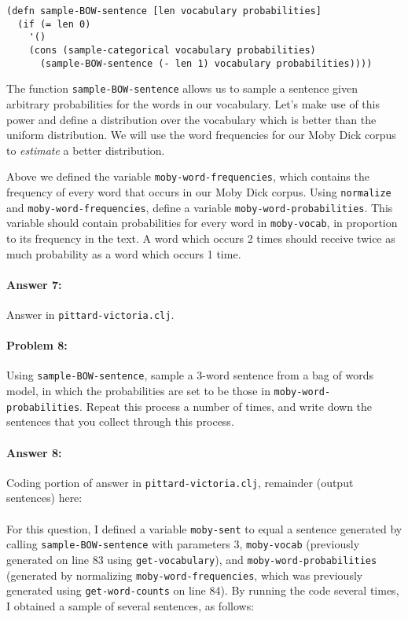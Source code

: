 \documentclass[10pt]{article}
\begin{document}
\begin{lstlisting}
(defn sample-BOW-sentence [len vocabulary probabilities]
  (if (= len 0)
    '()
    (cons (sample-categorical vocabulary probabilities)
	  (sample-BOW-sentence (- len 1) vocabulary probabilities))))
\end{lstlisting}

The function \texttt{sample-BOW-sentence} allows us to sample a
sentence given arbitrary probabilities for the words in our
vocabulary. Let's make use of this power and define a distribution
over the vocabulary which is better than the uniform distribution. We
will use the word frequencies for our Moby Dick corpus to
\emph{estimate} a better distribution.
  
Above we defined the variable \texttt{moby-word-frequencies}, which
contains the frequency of every word that occurs in our Moby Dick
corpus. Using \texttt{normalize} and \texttt{moby-word-frequencies},
define a variable \texttt{moby-word-probabilities}. This variable
should contain probabilities for every word in \texttt{moby-vocab}, in
proportion to its frequency in the text. A word which occurs 2 times
should receive twice as much probability as a word which occurs 1
time.

\paragraph{Answer 7:} Answer in
\texttt{pittard-victoria.clj}.

\hrulefill
\paragraph{Problem 8:}

Using \texttt{sample-BOW-sentence}, sample a 3-word sentence from a
bag of words model, in which the probabilities are set to be those in
\texttt{moby-word-probabilities}. Repeat this process a number of
times, and write down the sentences that you collect through this
process.

\paragraph{Answer 8:} Coding portion of answer in
\texttt{pittard-victoria.clj}, remainder (output sentences) here:

\paragraph{} For this question, I defined a variable \texttt{moby-sent} to equal a sentence generated by calling \texttt{sample-BOW-sentence} with parameters $3$, \texttt{moby-vocab} (previously generated on line 83 using \texttt{get-vocabulary}), and \texttt{moby-word-probabilities} (generated by normalizing \texttt{moby-word-frequencies}, which was previously generated using \texttt{get-word-counts} on line 84). By running the code several times, I obtained a sample of several sentences, as follows:
\end{document}
